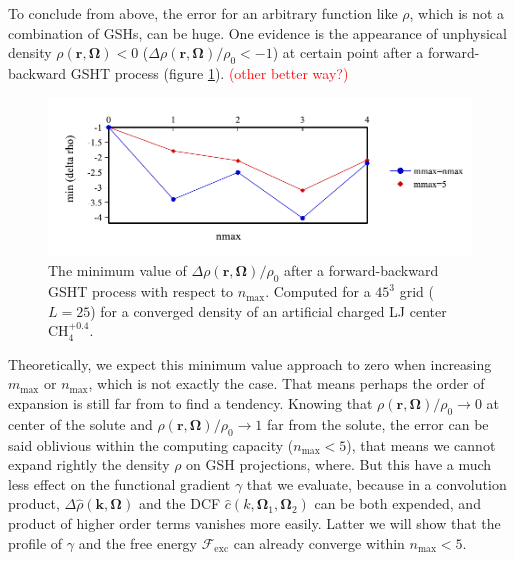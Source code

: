 To conclude from above, the error for an arbitrary function like $\rho$,
which is not a combination of \acs{GSH}s, can be huge. One evidence
is the appearance of unphysical density $\rho(\mathbf{r},\mathbf{\Omega})<0$
($\Delta\rho(\mathbf{r},\mathbf{\Omega})/\rho_{0}<-1$) at certain
point after a forward-backward \acs{GSHT} process (figure \ref{fig:unphysical-rho}).
\textcolor{red}{(other better way?)}

\begin{figure}[h]
\begin{centering}
\includegraphics[bb=0bp 10bp 454bp 160bp,width=0.75\columnwidth]{_figure/results/min_delta_rho}
\par\end{centering}
\caption[The minimum value of $\Delta\rho(\mathbf{r},\mathbf{\Omega})/\rho_{0}$
after a forward-backward \acs{GSHT} process]{The minimum value of $\Delta\rho(\mathbf{r},\mathbf{\Omega})/\rho_{0}$
after a forward-backward \acs{GSHT} process with respect to $n_{\max}$.
Computed for a $45^{3}$ grid ($L=25$) for a converged density of
an artificial charged LJ center $\mathrm{CH}_{4}^{+0.4}$. \label{fig:unphysical-rho} }
\end{figure}

Theoretically, we expect this minimum value approach to zero when
increasing $m_{\max}$ or $n_{\max}$, which is not exactly the case.
That means perhaps the order of expansion is still far from to find
a tendency. Knowing that $\rho(\mathbf{r},\mathbf{\Omega})/\rho_{0}\rightarrow0$
at center of the solute and $\rho(\mathbf{r},\mathbf{\Omega})/\rho_{0}\rightarrow1$
far from the solute, the error can be said oblivious within the computing
capacity ($n_{\max}<5$), that means we cannot expand rightly the
density $\rho$ on \acs{GSH} projections, where. But this have a
much less effect on the functional gradient $\gamma$ that we evaluate,
because in a convolution product, $\Delta\hat{\rho}(\mathbf{k},\mathbf{\Omega})$
and the \acs{DCF} $\hat{c}(k,\mathbf{\Omega}_{1},\mathbf{\Omega}_{2})$
can be both expended, and product of higher order terms vanishes more
easily. Latter we will show that the profile of $\gamma$ and the
free energy $\mathcal{F}_{\mathrm{exc}}$ can already converge within
$n_{\max}<5$.

